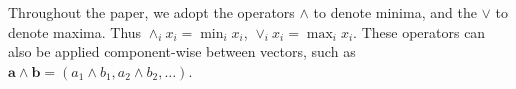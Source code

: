
  
Throughout the paper, we adopt the operators $\wedge$ to denote minima, and the $\vee$
  to denote maxima.  Thus $\wedge_i x_i = \min_i x_i$, $\vee_i x_i = \max_i x_i$.  These operators can
  also be applied component-wise between vectors, such as $\bm{a}\wedge\bm{b} = (a_1\wedge b_1, a_2\wedge b_2,\ldots)$.
  

